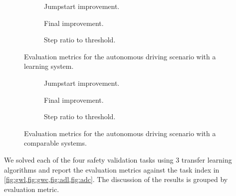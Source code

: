 \begin{figure}
    \centering
    \begin{subfigure}[b]{0.32\textwidth}
        \centering
        
        \caption{Jumpstart improvement.}
        \label{fig:adl_jumpstart}
    \end{subfigure}
    \hfill
    \begin{subfigure}[b]{0.32\textwidth}
        \centering
        
        \caption{Final improvement.}
        \label{fig:adl_final}
    \end{subfigure}
    \hfill
    \begin{subfigure}[b]{0.32\textwidth}
        \centering
        
        \caption{Step ratio to threshold.}
        \label{fig:adl_step}
    \end{subfigure}
    \caption{Evaluation metrics for the autonomous driving scenario with a learning system.}
    \label{fig:adl}
\end{figure}




\begin{figure}
    \centering
    \begin{subfigure}[b]{0.32\textwidth}
        \centering
        
        \caption{Jumpstart improvement.}
        \label{fig:adc_jumpstart}
    \end{subfigure}
    \hfill
    \begin{subfigure}[b]{0.32\textwidth}
        \centering
        
        \caption{Final improvement.}
        \label{fig:adc_final}
    \end{subfigure}
    \hfill
    \begin{subfigure}[b]{0.32\textwidth}
        \centering
        
        \caption{Step ratio to threshold.}
        \label{fig:adc_step}
    \end{subfigure}
    \caption{Evaluation metrics for the autonomous driving scenario with a comparable systems.}
    \label{fig:adc}
\end{figure}


We solved each of the four safety validation tasks using 3 transfer learning algorithms and report the evaluation metrics against the task index in \cref{fig:gwl,fig:gwc,fig:adl,fig:adc}. The discussion of the results is grouped by evaluation metric. 


